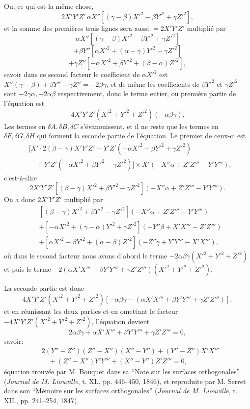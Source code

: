 \documentclass[11pt]{article}
\newcommand{\D}{\delta}
\begin{document}
Ou, ce qui est la m\^eme chose,
\[
2X'Y'Z'\,\alpha X''[(\gamma-\beta)X'^2-\beta Y'^2+\gamma Z'^2],
\]
et la somme des premi\`eres trois lignes sera aussi $=2X'Y'Z'$ multipli\'e par
\[
\alpha X''[(\gamma-\beta)X'^2-\beta Y'^2+\gamma Z'^2]
\]
\[
+\beta Y''[\alpha X'^2+(\alpha-\gamma)Y'^2-\gamma Z'^2]
\]
\[
+\gamma Z''[-\alpha X'^2+\beta Y'^2+(\beta-\alpha)Z'^2],
\]
savoir dans ce second facteur le coefficient de $\alpha X'^2$ est
$X''(\gamma-\beta)+\beta Y''-\gamma Z''=-2\beta\gamma$, et de m\^eme les coefficients de
$\beta Y'^2$ et $\gamma Z'^2$ sont $-2\gamma\alpha,-2\alpha\beta$ respectivement, donc le
terme entier, ou premi\`ere partie de l'\'equation est
\[
4X'Y'Z'(X'^2+Y'^2+Z'^2)(-\alpha\beta\gamma).
\]
Les termes en $\D A,\D B,\D C$ s'\'evanouissent, et il ne reste que les termes en
$\D F,\D G,\D H$ qui forment la seconde partie de l'\'equation. Le premier de ceux-ci est
\[
\begin{split}
&[X'\cdot2(\beta-\gamma)X'Y'Z'-Y'Z'(-\alpha X'^2-\beta Y'^2+\gamma Z'^2)\\
&\quad+Y'Z'(-\alpha X'^2+\beta Y'^2-\gamma Z'^2)]
\times X'(-X''\alpha+Z'Z'''-Y'Y'''),
\end{split}
\]
c'est-\`a-dire
\[
2X'Y'Z'[(\beta-\gamma)X'^2+\beta Y'^2-\gamma Z'^2]
(-X''\alpha+Z'Z'''-Y'Y''').
\]
On a donc $2X'Y'Z'$ multipli\'e par
\[
\begin{split}
&[(\beta-\gamma)X'^2+\beta Y'^2-\gamma Z'^2](-X''\alpha+Z'Z'''-Y'Y''')\\
&+[-\alpha X'^2+(\gamma-\alpha)Y'^2+\gamma Z'^2](-Y''\beta+X'X'''-Z'Z''')\\
&+[\alpha X'^2-\beta Y'^2+(\alpha-\beta)Z'^2](-Z''\gamma+Y'Y'''-X'X'''),
\end{split}
\]
o\`u dans le second facteur nous avons d'abord le terme
$-2\alpha\beta\gamma(X'^2+Y'^2+Z'^2)$ et puis le terme
$-2(\alpha X'X'''+\beta Y'Y'''+\gamma Z'Z''')(X'^2+Y'^2+Z'^2)$.

La seconde partie est donc
\[
4X'Y'Z'(X'^2+Y'^2+Z'^2)
[-\alpha\beta\gamma-(\alpha X'X'''+\beta Y'Y'''+\gamma Z'Z''')],
\]
et en r\'eunissant les deux parties et en omettant le facteur
$-4X'Y'Z'(X'^2+Y'^2+Z'^2)$, l'\'equation devient
\[
2\alpha\beta\gamma+\alpha X'X'''+\beta Y'Y'''+\gamma Z'Z'''=0,
\]
savoir:
\[
\begin{split}
&2(Y''-Z'')(Z''-X'')(X''-Y'')+(Y''-Z'')X'X'''\\
&\quad +(Z''-X'')Y'Y'''+(X''-Y'')Z'Z'''=0,
\end{split}
\]
\'equation trouv\'ee par M. Bouquet dans sa ``Note sur les surfaces orthogonales''
(\textit{Journal de M. Liouville}, t. XI., pp. 446--450, 1846), et reproduite par M. Serret
dans son ``M\'emoire sur les surfaces orthogonales'' (\textit{Journal de M. Liouville}, t. XII.,
pp. 241--254, 1847).
\end{document}
